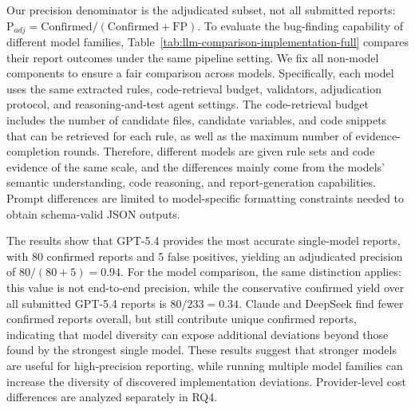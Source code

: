 Our precision denominator is the adjudicated subset, not 
all submitted reports: $\mathrm{P}_{adj}=\mathrm{Confirmed}/(\mathrm{Confirmed}+\mathrm{FP})$.
To evaluate the bug-finding capability of different model families,
Table~\ref{tab:llm-comparison-implementation-full} compares their report outcomes under the
same pipeline setting. We fix all non-model components to ensure a fair
comparison across models. Specifically, each model uses the same extracted
rules, code-retrieval budget, validators, adjudication protocol, and reasoning-and-test agent
settings. The code-retrieval budget includes the number of candidate files,
candidate variables, and code snippets that can be retrieved for each rule, as
well as the maximum number of evidence-completion rounds. Therefore, different
models are given rule sets and code evidence of the same scale, and the
differences mainly come from the models' semantic understanding, code reasoning,
and report-generation capabilities. Prompt differences are limited to
model-specific formatting constraints needed to obtain schema-valid JSON
outputs. 

The results show that GPT-5.4 provides the most accurate single-model reports,
with 80 confirmed reports and 5 false positives, yielding an adjudicated
precision of $80/(80+5)=0.94$. For the model comparison, the same distinction
applies: this value is not end-to-end precision, while the conservative
confirmed yield over all submitted GPT-5.4 reports is $80/233=0.34$.
Claude and DeepSeek find fewer confirmed reports overall, but still contribute
unique confirmed reports, indicating that model diversity can expose additional
deviations beyond those found by the strongest single model. These results
suggest that stronger models are useful for high-precision reporting, while
running multiple model families can increase the diversity of discovered
implementation deviations. Provider-level cost differences are analyzed
separately in RQ4.    



